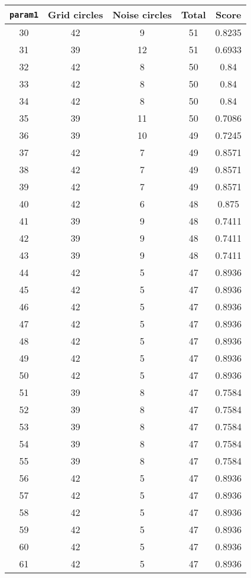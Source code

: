 \documentclass[letterpaper, 12pt]{article}
\begin{document}
\begin{longtable}{|c|c|c|c|c|}
\hline
\textbf{\texttt{param1}} & \textbf{Grid circles} & \textbf{Noise circles} & \textbf{Total} & \textbf{Score} \\
\hline
30 & 42 & 9 & 51 & 0.8235 \\
\hline
31 & 39 & 12 & 51 & 0.6933 \\
\hline
32 & 42 & 8 & 50 & 0.84 \\
\hline
33 & 42 & 8 & 50 & 0.84 \\
\hline
34 & 42 & 8 & 50 & 0.84 \\
\hline
35 & 39 & 11 & 50 & 0.7086 \\
\hline
36 & 39 & 10 & 49 & 0.7245 \\
\hline
37 & 42 & 7 & 49 & 0.8571 \\
\hline
38 & 42 & 7 & 49 & 0.8571 \\
\hline
39 & 42 & 7 & 49 & 0.8571 \\
\hline
40 & 42 & 6 & 48 & 0.875 \\
\hline
41 & 39 & 9 & 48 & 0.7411 \\
\hline
42 & 39 & 9 & 48 & 0.7411 \\
\hline
43 & 39 & 9 & 48 & 0.7411 \\
\hline
44 & 42 & 5 & 47 & 0.8936 \\
\hline
45 & 42 & 5 & 47 & 0.8936 \\
\hline
46 & 42 & 5 & 47 & 0.8936 \\
\hline
47 & 42 & 5 & 47 & 0.8936 \\
\hline
48 & 42 & 5 & 47 & 0.8936 \\
\hline
49 & 42 & 5 & 47 & 0.8936 \\
\hline
50 & 42 & 5 & 47 & 0.8936 \\
\hline
51 & 39 & 8 & 47 & 0.7584 \\
\hline
52 & 39 & 8 & 47 & 0.7584 \\
\hline
53 & 39 & 8 & 47 & 0.7584 \\
\hline
54 & 39 & 8 & 47 & 0.7584 \\
\hline
55 & 39 & 8 & 47 & 0.7584 \\
\hline
56 & 42 & 5 & 47 & 0.8936 \\
\hline
57 & 42 & 5 & 47 & 0.8936 \\
\hline
58 & 42 & 5 & 47 & 0.8936 \\
\hline
59 & 42 & 5 & 47 & 0.8936 \\
\hline
60 & 42 & 5 & 47 & 0.8936 \\
\hline
61 & 42 & 5 & 47 & 0.8936 \\

\end{longtable}
\end{document}
